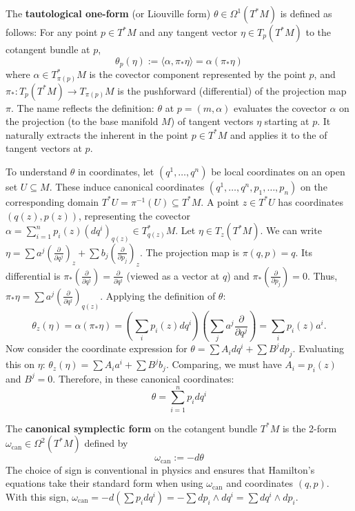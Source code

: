 \begin{definition}
The \textbf{tautological one-form} (or Liouville form) $\theta \in \Omega^{1}(T^*M)$ is defined as follows: For any point $p \in T^*M$ and any tangent vector $\eta \in T_p(T^*M)$ to the cotangent bundle at $p$,
\[
\theta_p(\eta) := \langle \alpha, \pi_* \eta \rangle = \alpha( \pi_* \eta )
\]
where $\alpha \in T^*_{\pi(p)} M$ is the covector component represented by the point $p$, and $\pi_*: T_p(T^*M) \to T_{\pi(p)}M$ is the pushforward (differential) of the projection map $\pi$.
The name  reflects the definition: $\theta$ at $p=(m, \alpha)$ evaluates the covector $\alpha$ on the projection (to the base manifold $M$) of tangent vectors $\eta$ starting at $p$. It naturally extracts the  inherent in the point $p \in T^*M$ and applies it to the  of tangent vectors at $p$.
\end{definition}

To understand $\theta$ in coordinates, let $(q^1, \dots, q^n)$ be local coordinates on an open set $U \subseteq M$. These induce canonical coordinates $(q^1, \dots, q^n, p_1, \dots, p_n)$ on the corresponding domain $T^*U = \pi^{-1}(U) \subseteq T^*M$. A point $z \in T^*U$ has coordinates $(q(z), p(z))$, representing the covector $\alpha = \sum_{i=1}^n p_i(z) (dq^i)_{q(z)} \in T^*_{q(z)}M$. Let $\eta \in T_z(T^*M)$. We can write $\eta = \sum a^j (\frac{\partial}{\partial q^j})_z + \sum b_j (\frac{\partial}{\partial p_j})_z$. The projection map is $\pi(q, p) = q$. Its differential is $\pi_*(\frac{\partial}{\partial q^j}) = \frac{\partial}{\partial q^j}$ (viewed as a vector at $q$) and $\pi_*(\frac{\partial}{\partial p_j}) = 0$. Thus, $\pi_* \eta = \sum a^j (\frac{\partial}{\partial q^j})_{q(z)}$.
Applying the definition of $\theta$:
\[
\theta_z(\eta) = \alpha(\pi_* \eta) = \left( \sum_i p_i(z) dq^i \right) \left( \sum_j a^j \frac{\partial}{\partial q^j} \right) = \sum_i p_i(z) a^i.
\]
Now consider the coordinate expression for $\theta = \sum A_i dq^i + \sum B^j dp_j$. Evaluating this on $\eta$: $\theta_z(\eta) = \sum A_i a^i + \sum B^j b_j$. Comparing, we must have $A_i = p_i(z)$ and $B^j = 0$. Therefore, in these canonical coordinates:
\[
\theta = \sum_{i=1}^n p_i dq^i
\]

\begin{definition}
The \textbf{canonical symplectic form} on the cotangent bundle $T^*M$ is the 2-form $\omega_{\text{can}} \in \Omega^{2}(T^*M)$ defined by
\[
\omega_{\text{can}} := -d\theta
\]
The choice of sign is conventional in physics and ensures that Hamilton's equations take their standard form when using $\omega_{\text{can}}$ and coordinates $(q, p)$. With this sign, $\omega_{\text{can}} = -d(\sum p_i dq^i) = -\sum dp_i \wedge dq^i = \sum dq^i \wedge dp_i$.
\end{definition}

